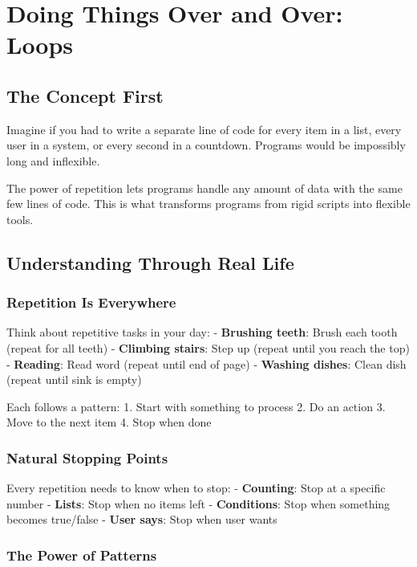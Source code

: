 \documentclass[
  letterpaper,
  DIV=11,
  numbers=noendperiod,
  oneside]{scrreprt}
\begin{document}
\chapter{Doing Things Over and Over: Loops}\label{sec-loops}

\section{The Concept First}\label{the-concept-first-4}

Imagine if you had to write a separate line of code for every item in a
list, every user in a system, or every second in a countdown. Programs
would be impossibly long and inflexible.

The power of repetition lets programs handle any amount of data with the
same few lines of code. This is what transforms programs from rigid
scripts into flexible tools.

\section{Understanding Through Real
Life}\label{understanding-through-real-life-4}

\subsection{Repetition Is Everywhere}\label{repetition-is-everywhere}

Think about repetitive tasks in your day: - \textbf{Brushing teeth}:
Brush each tooth (repeat for all teeth) - \textbf{Climbing stairs}: Step
up (repeat until you reach the top) - \textbf{Reading}: Read word
(repeat until end of page) - \textbf{Washing dishes}: Clean dish (repeat
until sink is empty)

Each follows a pattern: 1. Start with something to process 2. Do an
action 3. Move to the next item 4. Stop when done

\subsection{Natural Stopping Points}\label{natural-stopping-points}

Every repetition needs to know when to stop: - \textbf{Counting}: Stop
at a specific number - \textbf{Lists}: Stop when no items left -
\textbf{Conditions}: Stop when something becomes true/false -
\textbf{User says}: Stop when user wants

\subsection{The Power of Patterns}\label{the-power-of-patterns}
\end{document}
